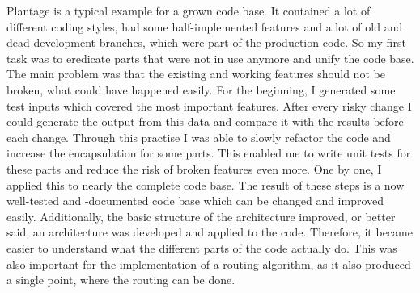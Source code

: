 Plantage is a typical example for a grown code base. It contained a lot of different coding styles, had some half-implemented features and a lot of old and dead development branches, which were part of the production code. So my first task was to eredicate parts that were not in use anymore and unify the code base. The main problem was that the existing and working features should not be broken, what could have happened easily. For the beginning, I generated some test inputs which covered the most important features. After every risky change I could generate the output from this data and compare it with the results before each change. Through this practise I was able to slowly refactor the code and increase the encapsulation for some parts. This enabled me to write unit tests for these parts and reduce the risk of broken features even more. One by one, I applied this to nearly the complete code base. The result of these steps is a now well-tested and -documented code base which can be changed and improved easily. Additionally, the basic structure of the architecture improved, or better said, an architecture was developed and applied to the code. Therefore, it became easier to understand what the different parts of the code actually do. This was also important for the implementation of a routing algorithm, as it also produced a single point, where the routing can be done.